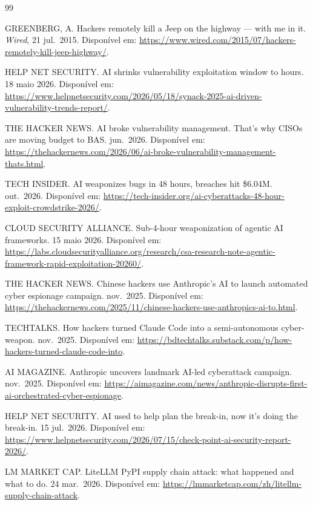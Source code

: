 \documentclass[12pt,a4paper]{article}
\begin{document}
\newpage
\renewcommand{\refname}{Referências}
\begin{thebibliography}{99}
\small\sloppy

GREENBERG, A. Hackers remotely kill a Jeep on the highway --- with me in it.
\emph{Wired}, 21 jul.\ 2015. Disponível em:
\url{https://www.wired.com/2015/07/hackers-remotely-kill-jeep-highway/}.

HELP NET SECURITY. AI shrinks vulnerability exploitation window to hours.
18 maio 2026. Disponível em:
\url{https://www.helpnetsecurity.com/2026/05/18/synack-2025-ai-driven-vulnerability-trends-report/}.

THE HACKER NEWS. AI broke vulnerability management. That's why CISOs are
moving budget to BAS. jun.\ 2026. Disponível em:
\url{https://thehackernews.com/2026/06/ai-broke-vulnerability-management-thats.html}.

TECH INSIDER. AI weaponizes bugs in 48 hours, breaches hit \$6.04M. out.\ 2026.
Disponível em:
\url{https://tech-insider.org/ai-cyberattacks-48-hour-exploit-crowdstrike-2026/}.

CLOUD SECURITY ALLIANCE. Sub-4-hour weaponization of agentic AI frameworks.
15 maio 2026. Disponível em:
\url{https://labs.cloudsecurityalliance.org/research/csa-research-note-agentic-framework-rapid-exploitation-20260/}.

THE HACKER NEWS. Chinese hackers use Anthropic's AI to launch automated cyber
espionage campaign. nov.\ 2025. Disponível em:
\url{https://thehackernews.com/2025/11/chinese-hackers-use-anthropics-ai-to.html}.

TECHTALKS. How hackers turned Claude Code into a semi-autonomous cyber-weapon.
nov.\ 2025. Disponível em:
\url{https://bdtechtalks.substack.com/p/how-hackers-turned-claude-code-into}.

AI MAGAZINE. Anthropic uncovers landmark AI-led cyberattack campaign. nov.\ 2025.
Disponível em:
\url{https://aimagazine.com/news/anthropic-disrupts-first-ai-orchestrated-cyber-espionage}.

HELP NET SECURITY. AI used to help plan the break-in, now it's doing the
break-in. 15 jul.\ 2026. Disponível em:
\url{https://www.helpnetsecurity.com/2026/07/15/check-point-ai-security-report-2026/}.

LM MARKET CAP. LiteLLM PyPI supply chain attack: what happened and what to do.
24 mar.\ 2026. Disponível em:
\url{https://lmmarketcap.com/zh/litellm-supply-chain-attack}.


\end{thebibliography}
\end{document}

